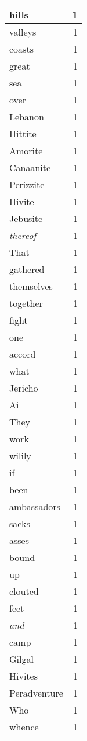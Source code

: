 \begin{center}
\begin{longtable}{l|r}
hills & 1\\ \hline 
valleys & 1\\ \hline 
coasts & 1\\ \hline 
great & 1\\ \hline 
sea & 1\\ \hline 
over & 1\\ \hline 
Lebanon & 1\\ \hline 
Hittite & 1\\ \hline 
Amorite & 1\\ \hline 
Canaanite & 1\\ \hline 
Perizzite & 1\\ \hline 
Hivite & 1\\ \hline 
Jebusite & 1\\ \hline 
\emph{thereof} & 1\\ \hline 
That & 1\\ \hline 
gathered & 1\\ \hline 
themselves & 1\\ \hline 
together & 1\\ \hline 
fight & 1\\ \hline 
one & 1\\ \hline 
accord & 1\\ \hline 
what & 1\\ \hline 
Jericho & 1\\ \hline 
Ai & 1\\ \hline 
They & 1\\ \hline 
work & 1\\ \hline 
wilily & 1\\ \hline 
if & 1\\ \hline 
been & 1\\ \hline 
ambassadors & 1\\ \hline 
sacks & 1\\ \hline 
asses & 1\\ \hline 
bound & 1\\ \hline 
up & 1\\ \hline 
clouted & 1\\ \hline 
feet & 1\\ \hline 
\emph{and} & 1\\ \hline 
camp & 1\\ \hline 
Gilgal & 1\\ \hline 
Hivites & 1\\ \hline 
Peradventure & 1\\ \hline 
Who & 1\\ \hline 
whence & 1\\ \hline 

\end{longtable}
\end{center}
